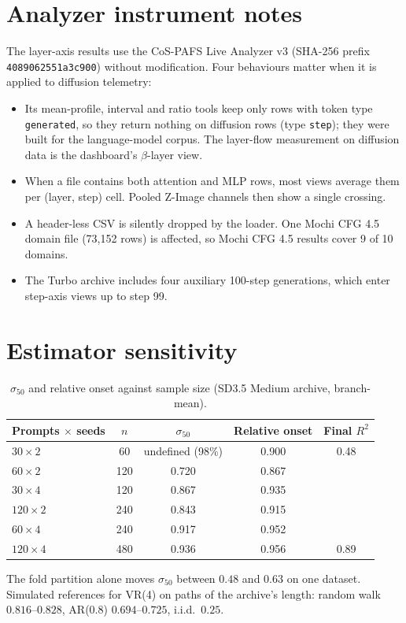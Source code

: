 \documentclass[11pt]{article}
\begin{document}
\section{Analyzer instrument notes}\label{app:analyzer}
The layer-axis results use the CoS-PAFS Live Analyzer v3 (SHA-256 prefix \texttt{4089062551a3c900}) without modification. Four behaviours matter when it is applied to diffusion telemetry:
\begin{itemize}
 \item Its mean-profile, interval and ratio tools keep only rows with token type \texttt{generated}, so they return nothing on diffusion rows (type \texttt{step}); they were built for the language-model corpus. The layer-flow measurement on diffusion data is the dashboard's $\beta$-layer view.
 \item When a file contains both attention and MLP rows, most views average them per (layer, step) cell. Pooled Z-Image channels then show a single crossing.
 \item A header-less CSV is silently dropped by the loader. One Mochi CFG 4.5 domain file (73{,}152 rows) is affected, so Mochi CFG 4.5 results cover 9 of 10 domains.
 \item The Turbo archive includes four auxiliary 100-step generations, which enter step-axis views up to step 99.
\end{itemize}

\section{Estimator sensitivity}\label{app:estimators}
\begin{table}[h]
\centering\small
\caption{$\sigma_{50}$ and relative onset against sample size (SD3.5 Medium archive, branch-mean).}
\begin{tabular}{lcccc}
\toprule
Prompts $\times$ seeds & $n$ & $\sigma_{50}$ & Relative onset & Final $R^2$\\
\midrule
$30\times2$ & 60 & undefined (98\%) & 0.900 & 0.48\\
$60\times2$ & 120 & 0.720 & 0.867 & \\
$30\times4$ & 120 & 0.867 & 0.935 & \\
$120\times2$ & 240 & 0.843 & 0.915 & \\
$60\times4$ & 240 & 0.917 & 0.952 & \\
$120\times4$ & 480 & 0.936 & 0.956 & 0.89\\
\bottomrule
\end{tabular}
\end{table}
The fold partition alone moves $\sigma_{50}$ between $0.48$ and $0.63$ on one dataset. Simulated references for VR(4) on paths of the archive's length: random walk $0.816$--$0.828$, AR(0.8) $0.694$--$0.725$, i.i.d.\ $0.25$.
\end{document}
